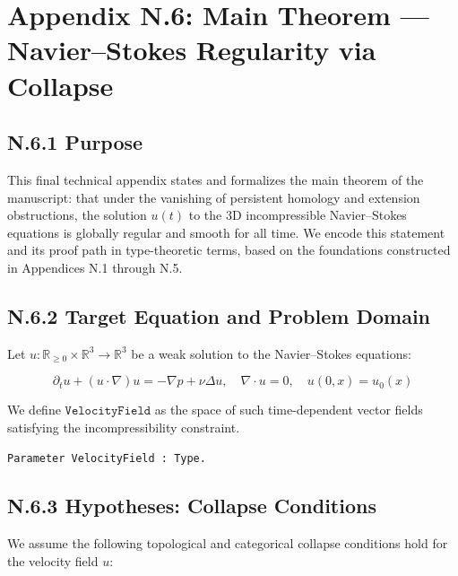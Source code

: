 \documentclass[11pt]{article}
\begin{document}

\section*{Appendix N.6: Main Theorem — Navier–Stokes Regularity via Collapse}

\subsection*{N.6.1 Purpose}

This final technical appendix states and formalizes the main theorem of the manuscript:  
that under the vanishing of persistent homology and extension obstructions, the solution $u(t)$ to the  
3D incompressible Navier–Stokes equations is globally regular and smooth for all time.  
We encode this statement and its proof path in type-theoretic terms, based on the foundations  
constructed in Appendices N.1 through N.5.

\subsection*{N.6.2 Target Equation and Problem Domain}

Let $u : \mathbb{R}_{\geq 0} \times \mathbb{R}^3 \to \mathbb{R}^3$ be a weak solution to the Navier–Stokes equations:

\[
\partial_t u + (u \cdot \nabla) u = -\nabla p + \nu \Delta u,\quad \nabla \cdot u = 0,\quad u(0,x) = u_0(x)
\]

We define $\texttt{VelocityField}$ as the space of such time-dependent vector fields satisfying the incompressibility constraint.

\begin{verbatim}
Parameter VelocityField : Type.
\end{verbatim}

\subsection*{N.6.3 Hypotheses: Collapse Conditions}

We assume the following topological and categorical collapse conditions hold for the velocity field $u$:
\end{document}

